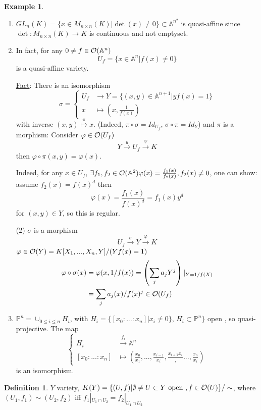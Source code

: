 \documentclass[11pt]{article}
\theoremstyle{definition}
\newtheorem{dfn}[thm]{Definition}
\newtheorem{ex}[thm]{Example}
\newcommand{\affn}{\mathbb A}
\newcommand{\proj}{\mathbb P}
\newcommand{\calo}{{\cal O}}
\newcommand{\lrta}{\longrightarrow}
\begin{document}
\begin{ex}\ 
\begin{enumerate}
\item $GL_n(K)=\{x\in M_{n\times n}(K)|\det(x)\neq 0\}\subset \affn^{n^2}$ is quasi-affine since $\det:M_{n\times n}(K)\lrta K$ is continuous and not emptyset.

\item In fact, for any $0\neq f\in \calo(\affn^n)$
$$
U_f=\{x\in \affn^n|f(x)\neq 0\}
$$
is a quasi-affine variety.

\underline{Fact}: There is an isomorphism
$$
\sigma = 
\left\{\begin{aligned}
U_f&\lrta Y=\{(x,y)\in\affn^{n+1}|yf(x)=1\}\\
x&\longmapsto \left(x,\frac{1}{f(x)}\right)
\end{aligned}
\right.
$$
with inverse
$(x,y)\overset{\pi}{\longmapsto}x$.
(Indeed, $\pi\circ \sigma=Id_{U_f}$, $\sigma\circ \pi=Id_Y$) and $\pi$ is a morphism: Consider $\varphi\in\calo(U_f)$
$$
Y\overset{u}{\lrta}U_f\overset{\varphi}{\lrta}K
$$
then $\varphi\circ \pi(x,y)=\varphi(x)$.

Indeed, for any $x\in U_f$, $\exists f_1,f_2\in \calo(\affn^2)\varphi(x)=\frac{f_1(x)}{f_2(x)}, f_2(x)\neq 0$, one can show: assume $f_2(x)=f(x)^d$ then 
$$
\varphi(x)=\frac{f_1(x)}{f(x)^d}=f_1(x)y^d
$$
for $(x,y)\in Y$, so this is regular.

(2) $\sigma$ is a morphism
$$
U_f\overset{\sigma}{\lrta}Y\overset{\varphi}{\lrta}K
$$
$\varphi\in\calo(Y)=K[X_1,...,X_n,Y]/(Yf(x)=1)$
$$
\begin{aligned}
\varphi\circ \sigma(x)&=\varphi(x,1/f(x))=\left(\sum_j a_j Y^j\right)|_{Y=1/f(X)}\\
&=\sum_j a_j (x)/f(x)^j\in \calo(U_f)
\end{aligned}
$$
\item $\proj^n=\cup_{0\leq i\leq n}H_i$, with $H_i=\{[x_0:...:x_n]|x_{i}\neq 0\}$, $H_i\subset \proj^n\}$ open , so quasi-projective. The map
$$
\left\{\begin{aligned}
H_i&\overset{f_i}{\lrta} \affn^n\\
[x_0:...:x_n]&\longmapsto (\frac{x_0}{x_1},...,\frac{x_{i-1}}{x_i},\frac{x_{i+1}{x_i}},...,\frac{x_n}{x_i})
\end{aligned}
\right.
$$
is an isomorphism.
\end{enumerate}
\end{ex}

\begin{dfn}
$Y$ variety, $K(Y)=\{(U,f)|\emptyset\neq U\subset Y\text{ open },f\in \calo(U)\}/\sim$, where $(U_1,f_1)\sim (U_2,f_2)$ iff $f_1|_{U_1\cap U_2}=f_2|_{U_1\cap U_2}$
\end{dfn}
\end{document}
